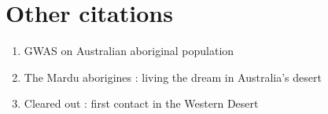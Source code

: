 \documentclass[a4paper, 10pt]{article}
\begin{document}
\section{Other citations}

\begin{enumerate}

   \item GWAS on Australian aboriginal population \cite{pmid25760438}
   \item The Mardu aborigines : living the dream in Australia's desert\cite{tonkinson2002}
   \item Cleared out : first contact in the Western Desert\cite{davenport2005}

\end{enumerate}


\end{document}
